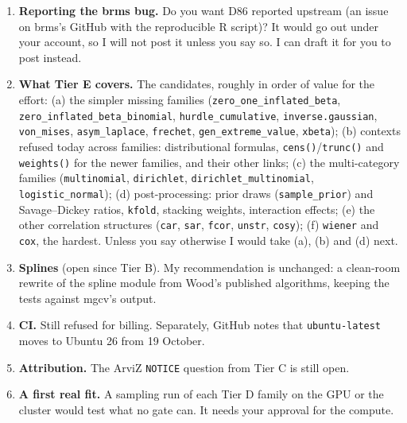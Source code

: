 \documentclass[11pt]{article}
\newcommand{\code}[1]{\texttt{#1}}
\newcommand{\file}[1]{\texttt{#1}}
\begin{document}
\begin{enumerate}
\item \textbf{Reporting the brms bug.} Do you want D86 reported upstream (an issue on brms's GitHub with the
  reproducible R script)? It would go out under your account, so I will not post it unless you say so. I can draft it
  for you to post instead.
\item \textbf{What Tier E covers.} The candidates, roughly in order of value for the effort:
  (a) the simpler missing families (\code{zero\_one\_inflated\_beta}, \code{zero\_inflated\_beta\_binomial},
  \code{hurdle\_cumulative}, \code{inverse.gaussian}, \code{von\_mises}, \code{asym\_laplace}, \code{frechet},
  \code{gen\_extreme\_value}, \code{xbeta});
  (b) contexts refused today across families: distributional formulas, \code{cens()}/\code{trunc()} and \code{weights()} for
  the newer families, and their other links;
  (c) the multi-category families (\code{multinomial}, \code{dirichlet}, \code{dirichlet\_multinomial},
  \code{logistic\_normal});
  (d) post-processing: prior draws (\code{sample\_prior}) and Savage--Dickey ratios, \code{kfold}, stacking weights,
  interaction effects;
  (e) the other correlation structures (\code{car}, \code{sar}, \code{fcor}, \code{unstr}, \code{cosy});
  (f) \code{wiener} and \code{cox}, the hardest.
  Unless you say otherwise I would take (a), (b) and (d) next.
\item \textbf{Splines} (open since Tier B). My recommendation is unchanged: a clean-room rewrite of the spline module
  from Wood's published algorithms, keeping the tests against mgcv's output.
\item \textbf{CI.} Still refused for billing. Separately, GitHub notes that \code{ubuntu-latest} moves to Ubuntu 26 from
  19 October.
\item \textbf{Attribution.} The ArviZ \file{NOTICE} question from Tier C is still open.
\item \textbf{A first real fit.} A sampling run of each Tier D family on the GPU or the cluster would test what no gate
  can. It needs your approval for the compute.
\end{enumerate}
\end{document}
